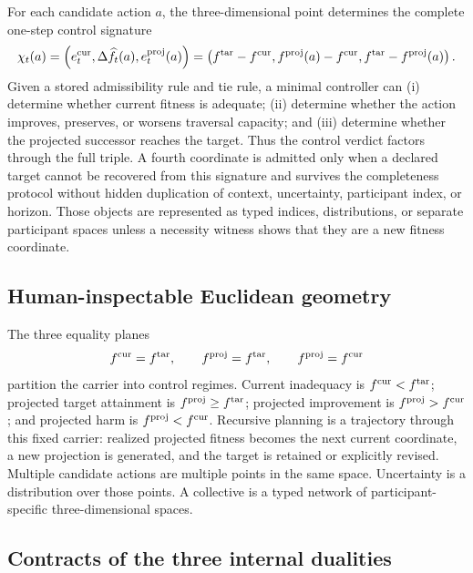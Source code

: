 \documentclass[11pt]{article}
\begin{document}
For each candidate action $a$, the three-dimensional point determines the complete one-step control signature
\begin{equation}
\chi_t(a)=\left(e_t^{\rm cur},\Delta\widehat f_t(a),e_t^{\rm proj}(a)\right)
=\left(f^{\rm tar}-f^{\rm cur},f^{\rm proj}(a)-f^{\rm cur},f^{\rm tar}-f^{\rm proj}(a)\right).
\end{equation}
Given a stored admissibility rule and tie rule, a minimal controller can (i) determine whether current fitness is adequate; (ii) determine whether the action improves, preserves, or worsens traversal capacity; and (iii) determine whether the projected successor reaches the target. Thus the control verdict factors through the full triple. A fourth coordinate is admitted only when a declared target cannot be recovered from this signature and survives the completeness protocol without hidden duplication of context, uncertainty, participant index, or horizon. Those objects are represented as typed indices, distributions, or separate participant spaces unless a necessity witness shows that they are a new fitness coordinate.

\subsection{Human-inspectable Euclidean geometry}

The three equality planes
\begin{equation}
f^{\rm cur}=f^{\rm tar},\qquad
f^{\rm proj}=f^{\rm tar},\qquad
f^{\rm proj}=f^{\rm cur}
\end{equation}
partition the carrier into control regimes. Current inadequacy is $f^{\rm cur}<f^{\rm tar}$; projected target attainment is $f^{\rm proj}\ge f^{\rm tar}$; projected improvement is $f^{\rm proj}>f^{\rm cur}$; and projected harm is $f^{\rm proj}<f^{\rm cur}$. Recursive planning is a trajectory through this fixed carrier: realized projected fitness becomes the next current coordinate, a new projection is generated, and the target is retained or explicitly revised. Multiple candidate actions are multiple points in the same space. Uncertainty is a distribution over those points. A collective is a typed network of participant-specific three-dimensional spaces.

\subsection{Contracts of the three internal dualities}
\end{document}
